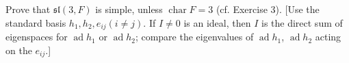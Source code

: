 Prove that $\mathfrak{sl}(3, F)$ is simple, unless $\operatorname{char} F = 3$ (cf. Exercise 3). [Use the standard basis $h_1, h_2, e_{ij} (i \neq j)$. If $I \neq 0$ is an ideal, then $I$ is the direct sum of eigenspaces for $\operatorname{ad} h_1$ or $\operatorname{ad} h_2$; compare the eigenvalues of $\operatorname{ad} h_1$, $\operatorname{ad} h_2$ acting on the $e_{ij}$.]
